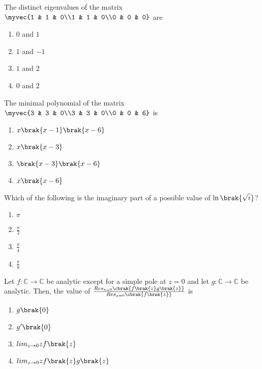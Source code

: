 \iffalse
\chapter{2011}
\author{EE24BTECH11003}
\section{ma}
\fi

\item The distinct eigenvalues of the matrix
$\myvec{1 & 1 & 0\\1 & 1 & 0\\0 & 0 & 0}$ are
\hfill{}
\begin{enumerate}
\item $0$ and $1$
\item $1$ and $-1$
\item $1$ and $2$
\item $0$ and $2$
\end{enumerate}

\item The minimal polynomial of the matrix
$\myvec{3 & 3 & 0\\3 & 3 & 0\\0 & 0 & 6}$ is
\hfill{}
\begin{enumerate}
\item $x\brak{x-1}\brak{x-6}$
\item $x\brak{x-3}$
\item $\brak{x-3}\brak{x-6}$
\item $x\brak{x-6}$
\end{enumerate}

\item Which of the following is the imaginary part of a possible value of $\ln \brak{\sqrt{i}}$?
\hfill{}
\begin{enumerate}
\item $\pi$
\item $\frac{\pi}{2}$
\item $\frac{\pi}{4}$
\item $\frac{\pi}{8}$
\end{enumerate}

\item Let $f\colon \mathbb{C} \to \mathbb{C}$ be analytic except for a simple pole at $z=0$ and let $g\colon \mathbb{C} \to \mathbb{C}$ be analytic. Then, the value of $\frac{Res_{z=0}\cbrak{f\brak{z}g\brak{z}}}{Res_{z=0}\cbrak{f\brak{z}}}$ is
\hfill{}
\begin{enumerate}
\item $g\brak{0}$
\item $g'\brak{0}$
\item $lim_{z \to 0} zf\brak{z}$
\item $lim_{z \to 0} zf\brak{z}g\brak{z}$
\end{enumerate}

